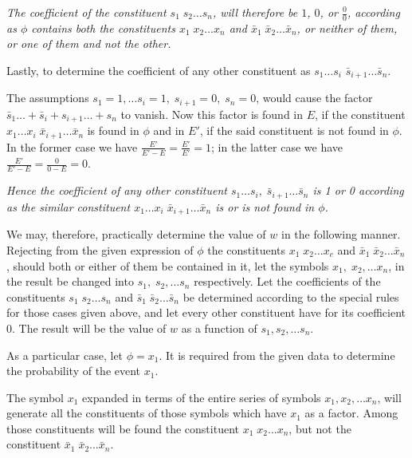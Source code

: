 \documentclass[oneside]{book}
\begin{document}
\emph{The coefficient of the constituent $s_1\; s_2 \dotsc s_n$, will therefore be
$1$, $0$, or $\frac{0}{0}$, according as $\phi$ contains both the constituents $x_1\; x_2 \dotsc x_n$
and $\bar{x}_1\; \bar{x}_2 \dotsc \bar{x}_n$, or neither of them, or one of them and not the
other.}

Lastly, to determine the coefficient of any other constituent
as $s_1 \dotsc s_i$ $\bar{s}_{i+1} \dotsc \bar{s}_n$.

The assumptions $s_1 = 1, \dotsc s_i = 1,\; s_{i+1} = 0,\; s_n = 0$, would
cause the factor $\bar{s}_1 \dotsc + \bar{s}_i + s_{i+1} \dotsc + s_n$ to vanish. Now this factor
is found in $E$, if the constituent
$x_1 \dotsc x_i \; \bar{x}_{i+1} \dotsc \bar{x}_n$ is found in
$\phi$ and in $E'$, if the said constituent is not found in $\phi$. In the
former case we have $\frac{E'}{E'-E} = \frac{E'}{E'} = 1$; in the latter case we have
$\frac{E'}{E'-E} = \frac{0}{0-E} = 0$.

\emph{Hence the coefficient of any other constituent
$s_1 \dotsc s_i, \; \bar{s}_{i+1} \dotsc \bar{s}_n$
is 1 or 0 according as the similar constituent
$x_1 \dotsc x_i \; \bar{x}_{i+1} \dotsc \bar{x}_n$
is or is not found in $\phi$.}

We may, therefore, practically determine the value of $w$ in
the following manner. Rejecting from the given expression of
$\phi$ the constituents $x_1 \; x_2 \dotsc x_c$ and %
$\bar{x}_1 \; \bar{x}_2 \dotsc \bar{x}_n$, should both or
either of them be contained in it, let the symbols
$x_1, \; x_2, \dotsc x_n$,
in the result be changed into $s_1, \; s_2, \dotsc s_n$ respectively. Let the coefficients
of the constituents $s_1 \; s_2 \dotsc s_n$ and $\bar{s}_1 \; \bar{s}_2 \dotsc \bar{s}_n$ be determined
according to the special rules for those cases given above, and let
every other constituent have for its coefficient 0. The result
will be the value of $w$ as a function of $s_1, s_2, \dotsc s_n$.

As a particular case, let $\phi = x_1$. It is required from the
given data to determine the probability of the event $x_1$.

The symbol $x_1$ expanded in terms of the entire series of symbols
$x_1, x_2, \dotsc x_n$, will generate all the constituents of those
symbols which have $x_1$ as a factor. Among those constituents
will be found the constituent $x_1 \; x_2 \dotsc x_n$, but not the constituent
$\bar{x}_1 \; \bar{x}_2 \dotsc \bar{x}_n$.
\end{document}
